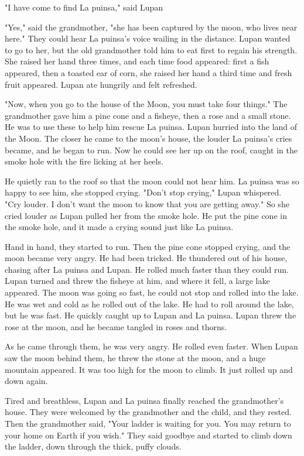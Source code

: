 "I have come to find La puinsa," said Lupan

"Yes," said the grandmother, "she has been captured by the moon, who lives near here." They could hear La puinsa's voice wailing in the distance. Lupan wanted to go to her, but the old grandmother told him to eat first to regain his strength. She raised her hand three times, and each time food appeared: first a fish appeared, then a toasted ear of corn, she raised her hand a third time and fresh fruit appeared. Lupan ate hungrily and felt refreshed.

"Now, when you go to the house of the Moon, you must take four things." The grandmother gave him a pine cone and a fisheye, then a rose and a small stone. He was to use these to help him rescue La puinsa. Lupan hurried into the land of the Moon. The closer he came to the moon's house, the louder La puinsa's cries became, and he began to run. Now he could see her up on the roof, caught in the smoke hole with the fire licking at her heels.

He quietly ran to the roof so that the moon could not hear him. La puinsa was so happy to see him, she stopped crying. "Don't stop crying," Lupan whispered. "Cry louder. I don't want the moon to know that you are getting away." So she cried louder as Lupan pulled her from the smoke hole. He put the pine cone in the smoke hole, and it made a crying sound just like La puinsa.

Hand in hand, they started to run. Then the pine cone stopped crying, and the moon became very angry. He had been tricked. He thundered out of his house, chasing after La puinsa and Lupan. He rolled much faster than they could run. Lupan turned and threw the fisheye at him, and where it fell, a large lake appeared. The moon was going so fast, he could not stop and rolled into the lake. He was wet and cold as he rolled out of the lake. He had to roll around the lake, but he was fast. He quickly caught up to Lupan and La puinsa. Lupan threw the rose at the moon, and he became tangled in roses and thorns.

As he came through them, he was very angry. He rolled even faster. When Lupan saw the moon behind them, he threw the stone at the moon, and a huge mountain appeared. It was too high for the moon to climb. It just rolled up and down again.

Tired and breathless, Lupan and La puinsa finally reached the grandmother's house. They were welcomed by the grandmother and the child, and they rested. Then the grandmother said, "Your ladder is waiting for you. You may return to your home on Earth if you wish." They said goodbye and started to climb down the ladder, down through the thick, puffy clouds.

